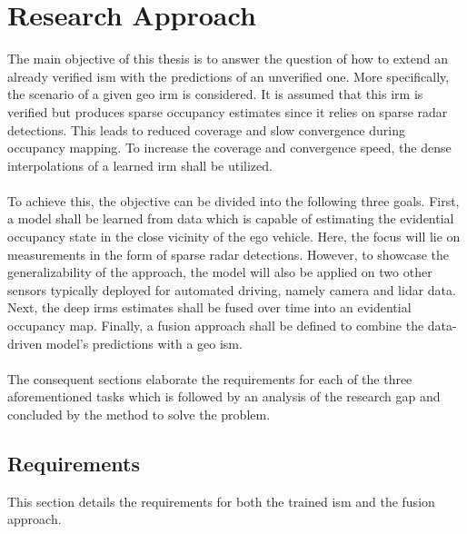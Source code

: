 \chapter{Research Approach}
\label{ch:research_approach}
The main objective of this thesis is to answer the question of how to extend an already verified \gls{ism} with the predictions of an unverified one. More specifically, the scenario of a given geo \gls{irm} is considered. It is assumed that this \gls{irm} is verified but produces sparse occupancy estimates since it relies on sparse radar detections. This leads to reduced coverage and slow convergence during occupancy mapping. To increase the coverage and convergence speed, the dense interpolations of a learned \gls{irm} shall be utilized.
\\\\
To achieve this, the objective can be divided into the following three goals. First, a model shall be learned from data which is capable of estimating the evidential occupancy state in the close vicinity of the ego vehicle. Here, the focus will lie on measurements in the form of sparse radar detections. However, to showcase the generalizability of the approach, the model will also be applied on two other sensors typically deployed for automated driving, namely camera and lidar data. Next, the deep \gls{irm}s estimates shall be fused over time into an evidential occupancy map. Finally, a fusion approach shall be defined to combine the data-driven model's predictions with a geo \gls{ism}.
\\\\
The consequent sections elaborate the requirements for each of the three aforementioned tasks which is followed by an analysis of the research gap and concluded by the method to solve the problem. 
%
\section{Requirements}
\label{sec:requirements}
This section details the requirements for both the trained \gls{ism} and the fusion approach.
%
